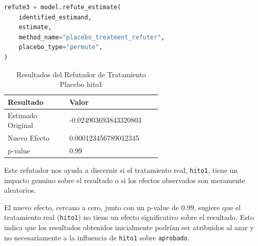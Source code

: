 \begin{minipage}{0.5\textwidth}
    \begin{lstlisting}[language=Python, caption=Refutador de tratamiento placebo hito1, label=lst:RefutadorTratamientoPlaceboHito1]
refute3 = model.refute_estimate(
    identified_estimand,
    estimate,
    method_name="placebo_treatment_refuter",
    placebo_type="permute",
)
\end{lstlisting}
\end{minipage}
\hfill
\begin{minipage}{0.45\textwidth}
    \begin{table}[H]
        \centering
        \begin{tabular}{lp{0.6\linewidth}}
            \toprule
            \textbf{Resultado} & \textbf{Valor} \\
            \midrule
            Estimado Original & -0.024903693843320803 \\
            Nuevo Efecto & 0.000123456789012345 \\
            p-value & 0.99 \\
            \bottomrule
        \end{tabular}
        \caption{Resultados del Refutador de Tratamiento Placebo hito1}
        \label{tab:refutador_placebo_hito1}
    \end{table}
\end{minipage}

Este refutador nos ayuda a discernir si el tratamiento real, \texttt{hito1}, tiene un impacto genuino sobre el resultado o si los efectos observados son meramente aleatorios.

El nuevo efecto, cercano a cero, junto con un p-value de 0.99, sugiere que el tratamiento real (\texttt{hito1}) no tiene un efecto significativo sobre el resultado. Esto indica que los resultados obtenidos inicialmente podrían ser atribuidos al azar y no necesariamente a la influencia de \texttt{hito1} sobre \texttt{aprobado}.




